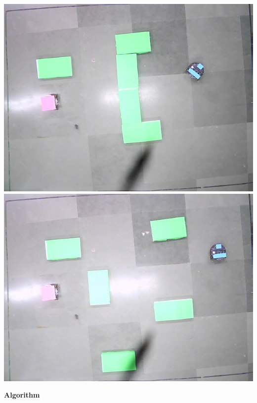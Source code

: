 \documentclass[report]{res}
\begin{document}
	\begin{center}
		\includegraphics[scale = 0.7]{graphics/case1/cap_image.jpeg}\\
		\includegraphics[scale = 0.7]{graphics/case2/cap_image.jpeg}\\
	\end{center}
	
	\pagebreak
	
	
	\begin{center}
		\textbf{\huge Algorithm} \\
	\end{center}
	
\end{document}
